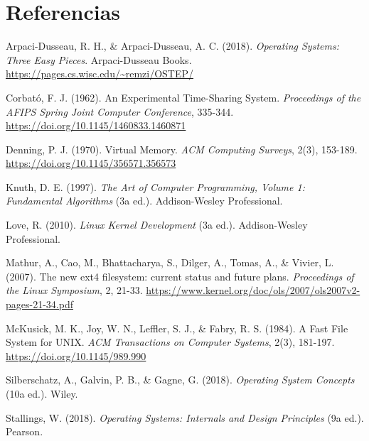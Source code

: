 \documentclass[12pt,a4paper]{article}
\begin{document}
\newpage
\section*{Referencias}

\noindent Arpaci-Dusseau, R. H., \& Arpaci-Dusseau, A. C. (2018). \textit{Operating Systems: Three Easy Pieces}. Arpaci-Dusseau Books. \url{https://pages.cs.wisc.edu/~remzi/OSTEP/}

\vspace{0.3cm}
\noindent Corbató, F. J. (1962). An Experimental Time-Sharing System. \textit{Proceedings of the AFIPS Spring Joint Computer Conference}, 335-344. \url{https://doi.org/10.1145/1460833.1460871}

\vspace{0.3cm}
\noindent Denning, P. J. (1970). Virtual Memory. \textit{ACM Computing Surveys}, 2(3), 153-189. \url{https://doi.org/10.1145/356571.356573}

\vspace{0.3cm}
\noindent Knuth, D. E. (1997). \textit{The Art of Computer Programming, Volume 1: Fundamental Algorithms} (3a ed.). Addison-Wesley Professional.

\vspace{0.3cm}
\noindent Love, R. (2010). \textit{Linux Kernel Development} (3a ed.). Addison-Wesley Professional.

\vspace{0.3cm}
\noindent Mathur, A., Cao, M., Bhattacharya, S., Dilger, A., Tomas, A., \& Vivier, L. (2007). The new ext4 filesystem: current status and future plans. \textit{Proceedings of the Linux Symposium}, 2, 21-33. \url{https://www.kernel.org/doc/ols/2007/ols2007v2-pages-21-34.pdf}

\vspace{0.3cm}
\noindent McKusick, M. K., Joy, W. N., Leffler, S. J., \& Fabry, R. S. (1984). A Fast File System for UNIX. \textit{ACM Transactions on Computer Systems}, 2(3), 181-197. \url{https://doi.org/10.1145/989.990}

\vspace{0.3cm}
\noindent Silberschatz, A., Galvin, P. B., \& Gagne, G. (2018). \textit{Operating System Concepts} (10a ed.). Wiley.

\vspace{0.3cm}
\noindent Stallings, W. (2018). \textit{Operating Systems: Internals and Design Principles} (9a ed.). Pearson.
\end{document}
